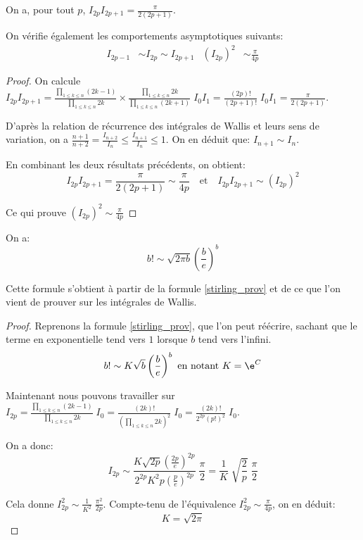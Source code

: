 \begin{prop}
On a, pour tout $p$, $I_{2p} I_{2p+1} = \frac{\pi}{2(2p+1)}$.

\medskip
On vérifie également les comportements asymptotiques suivants:
\begin{align*}
I_{2p-1} & \sim I_{2p} \sim I_{2p+1} &
\left (I_{2p}\right )^2 & \sim \frac{\pi}{4p}
\end{align*}
\end{prop}


\begin{proof}
On calcule $I_{2p} I_{2p+1} = \frac{\prod \limits_{1 \leq k \leq n} (2k-1)}{\prod \limits_{1 \leq k \leq n} 2k} \times \frac{\prod \limits_{1 \leq k \leq n} 2k}{\prod \limits_{1 \leq k \leq n} (2k+1)} \; I_0 I_1 = \frac{(2p)!}{(2p+1)!} \; I_0 I_1 = \frac{\pi}{2(2p+1)}$.

\medskip
D'après la relation de récurrence des intégrales de Wallis et leurs sens de variation, on a $\frac{n+1}{n+2} = \frac{I_{n+2}}{I_{n}} \leq \frac{I_{n+1}}{I_{n}} \leq 1$. On en déduit que:
$I_{n+1} \sim I_n$.

\medskip
En combinant les deux résultats précédents, on obtient:
\[
I_{2p} I_{2p+1} = \frac{\pi}{2(2p+1)} \sim \frac{\pi}{4p} \quad \text{et} \quad I_{2p} I_{2p+1} \sim \left ( I_{2p}\right )^2
\]

Ce qui prouve $\left (I_{2p}\right )^2 \sim \frac{\pi}{4p}$
\end{proof}

\begin{prop}
On a:
\[
b! \sim \sqrt{2\pi b} \left ( \frac{b}{e}\right )^b
\]
\end{prop}

Cette formule s'obtient à partir de la formule \ref{stirling_prov} et de ce que l'on vient de prouver sur les intégrales de Wallis.

\begin{proof}
Reprenons la formule \ref{stirling_prov}, que l'on peut réécrire, sachant que le terme en exponentielle tend vers $1$ lorsque $b$ tend vers l'infini.
\[
b! \sim K \sqrt{b} \left ( \frac{b}{e}\right )^b \text{ en notant }K = \e^C
\]

Maintenant nous pouvons travailler sur $I_{2p} = \frac{\prod \limits_{1 \leq k \leq n} (2k-1)}{\prod \limits_{1 \leq k \leq n} 2k} \; I_0 = \frac{(2k)!}{\left ( \prod \limits_{1 \leq k \leq n} 2k \right )^2} \; I_0 = \frac{(2k)!}{2^{2p} (p!)^2} \; I_0$.

On a donc:
\[
I_{2p} \sim \dfrac{K \sqrt{2p} \left ( \tfrac{2p}{e}\right )^{2p}}{2^{2p} K^2 p \left ( \tfrac{p}{e}\right )^{2p}} \; \frac{\pi}{2} = \frac{1}{K} \; \sqrt{\frac{2}{p}} \; \frac{\pi}{2}
\]

Cela donne $I_{2p}^2 \sim \frac{1}{K^2} \; \frac{\pi^2}{2p}$. Compte-tenu de l'équivalence $I_{2p}^2 \sim \frac{\pi}{4p}$, on en déduit:
\[
K = \sqrt{2\pi}
\]
\end{proof}


